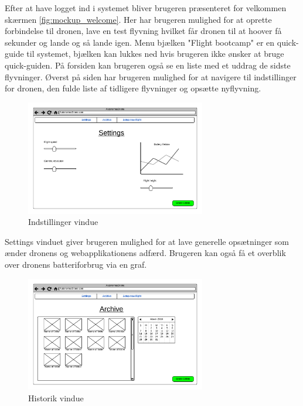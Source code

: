 Efter at have logget ind i systemet bliver brugeren præsenteret for velkommen skærmen \ref{fig:mockup_welcome}. Her har brugeren mulighed for at oprette forbindelse til dronen, lave en test flyvning hvilket får dronen til at hoover få sekunder og lande og så lande igen. Menu bjælken "Flight bootcamp" er en quick-guide til systemet, bjælken kan lukkes ned hvis brugeren ikke ønsker at bruge quick-guiden. På forsiden kan brugeren også se en liste med et uddrag de sidste flyvninger. Øverst på siden har brugeren mulighed for at navigere til indstillinger for dronen, den fulde liste af tidligere flyvninger og opsætte nyflyvning. \newpage

\vspace{-5pt}
\begin{figure}[H]
	\centering
	\includegraphics[width=0.7\textwidth]{Billeder/UI_mockups/settings.png}
	\vspace{-5pt}
	\caption{Indstillinger vindue}
	\label{fig:mockup_settings}
\end{figure}

Settings vinduet giver brugeren mulighed for at lave generelle opsætninger som ænder dronens og webapplikationens adfærd. Brugeren kan også få et overblik over dronens batteriforbrug via en graf.

\vspace{-5pt}
\begin{figure}[H]
	\centering
	\includegraphics[width=0.7\textwidth]{Billeder/UI_mockups/archive.png}
	\vspace{-5pt}
	\caption{Historik vindue}
	\label{fig:mockup_archive}
\end{figure}

